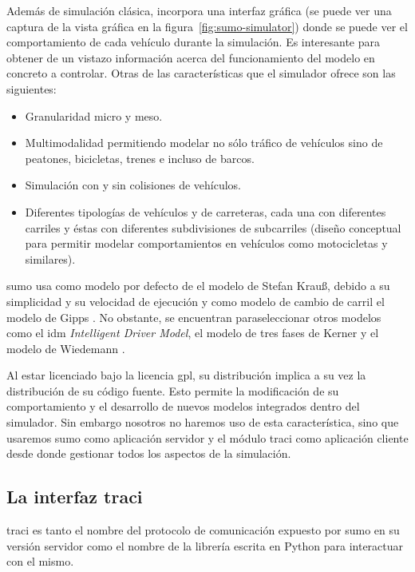 Además de simulación clásica, incorpora una interfaz gráfica (se puede ver una captura de la vista gráfica en la figura~\ref{fig:sumo-simulator}) donde se puede ver el comportamiento de cada vehículo durante la simulación. Es interesante para obtener de un vistazo información acerca del funcionamiento del modelo en concreto a controlar. Otras de las características que el simulador ofrece son las siguientes:

\begin{itemize}
	\item Granularidad micro y meso.
	\item Multimodalidad permitiendo modelar no sólo tráfico de vehículos sino de peatones, bicicletas, trenes e incluso de barcos.
	\item Simulación con y sin colisiones de vehículos.
	\item Diferentes tipologías de vehículos y de carreteras, cada una con diferentes carriles y éstas con diferentes subdivisiones de subcarriles (diseño conceptual para permitir modelar comportamientos en vehículos como motocicletas y similares).
\end{itemize}

\gls{sumo} usa como modelo por defecto de \textit{} el modelo de Stefan Krauß\cite{jin2016evaluation}, debido a su simplicidad y su velocidad de ejecución y como modelo de cambio de carril el modelo de Gipps \cite{krajzewicz2002sumo}. No obstante, se encuentran paraseleccionar otros modelos como el \gls{idm} \textit{Intelligent Driver Model}, el modelo de tres fases de Kerner \cite{kerner2008testbed} y el modelo de Wiedemann \cite{wiedemann1974simulation}.

Al estar licenciado bajo la licencia \gls{gpl}, su distribución implica a su vez la distribución de su código fuente. Esto permite la modificación de su comportamiento y el desarrollo de nuevos modelos integrados dentro del simulador. Sin embargo nosotros no haremos uso de esta característica, sino que usaremos \gls{sumo} como aplicación servidor y el módulo \gls{traci} como aplicación cliente desde donde gestionar todos los aspectos de la simulación.

\subsection{La interfaz \gls{traci}}

\gls{traci} \cite{Wegener2008} es tanto el nombre del protocolo de comunicación expuesto por \gls{sumo} en su versión servidor como el nombre de la librería escrita en Python para interactuar con el mismo.

